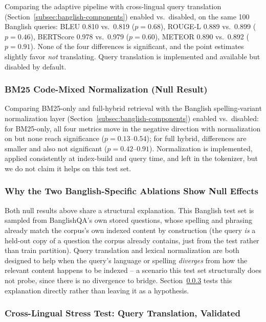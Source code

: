 \documentclass[a4paper,twoside]{article}
\begin{document}
Comparing the adaptive pipeline with cross-lingual query translation (Section~\ref{subsec:banglish-components}) enabled vs.\ disabled, on the same 100 Banglish queries: BLEU 0.810 vs.\ 0.819 ($p=0.68$), ROUGE-L 0.889 vs.\ 0.899 ($p=0.46$), BERTScore 0.978 vs.\ 0.979 ($p=0.60$), METEOR 0.890 vs.\ 0.892 ($p=0.91$). None of the four differences is significant, and the point estimates slightly favor \emph{not} translating. Query translation is implemented and available but disabled by default.

\subsubsection{BM25 Code-Mixed Normalization (Null Result)}

Comparing BM25-only and full-hybrid retrieval with the Banglish spelling-variant normalization layer (Section~\ref{subsec:banglish-components}) enabled vs.\ disabled: for BM25-only, all four metrics move in the negative direction with normalization on but none reach significance ($p=0.13$--$0.54$); for full hybrid, differences are smaller and also not significant ($p=0.42$--$0.91$). Normalization is implemented, applied consistently at index-build and query time, and left in the tokenizer, but we do not claim it helps on this test set.

\subsubsection{Why the Two Banglish-Specific Ablations Show Null Effects}

Both null results above share a structural explanation. This Banglish test set is sampled from BanglishQA's own stored questions, whose spelling and phrasing already match the corpus's own indexed content by construction (the query \emph{is} a held-out copy of a question the corpus already contains, just from the test rather than train partition). Query translation and lexical normalization are both designed to help when the query's language or spelling \emph{diverges} from how the relevant content happens to be indexed -- a scenario this test set structurally does not probe, since there is no divergence to bridge. Section~\ref{subsec:crosslingual-stress} tests this explanation directly rather than leaving it as a hypothesis.

\subsubsection{Cross-Lingual Stress Test: Query Translation, Validated}
\label{subsec:crosslingual-stress}
\end{document}
